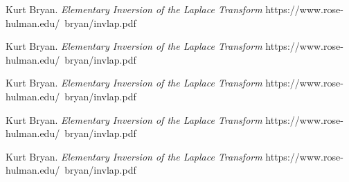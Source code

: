 \begin{thebibliography}{99}
 Kurt Bryan. {\it Elementary Inversion of the Laplace Transform} https://www.rose-hulman.edu/~bryan/invlap.pdf


 Kurt Bryan. {\it Elementary Inversion of the Laplace Transform} https://www.rose-hulman.edu/~bryan/invlap.pdf

 Kurt Bryan. {\it Elementary Inversion of the Laplace Transform} https://www.rose-hulman.edu/~bryan/invlap.pdf

 Kurt Bryan. {\it Elementary Inversion of the Laplace Transform} https://www.rose-hulman.edu/~bryan/invlap.pdf

 Kurt Bryan. {\it Elementary Inversion of the Laplace Transform} https://www.rose-hulman.edu/~bryan/invlap.pdf

\end{thebibliography}